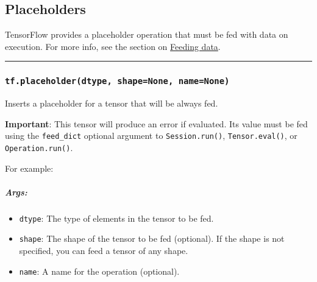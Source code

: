 \subsection{Placeholders }\label{placeholders}

TensorFlow provides a placeholder operation that must be fed with data
on execution. For more info, see the section on
\href{../../how_tos/reading_data/index.md\#feeding}{Feeding data}.

\begin{center}\rule{0.5\linewidth}{\linethickness}\end{center}

\subsubsection{\texorpdfstring{\texttt{tf.placeholder(dtype,\ shape=None,\ name=None)}
}{tf.placeholder(dtype, shape=None, name=None) }}\label{tf.placeholderdtype-shapenone-namenone}

Inserts a placeholder for a tensor that will be always fed.

\textbf{Important}: This tensor will produce an error if evaluated. Its
value must be fed using the \texttt{feed\_dict} optional argument to
\texttt{Session.run()}, \texttt{Tensor.eval()}, or
\texttt{Operation.run()}.

For example:

\begin{Shaded}
\begin{Highlighting}[]
\OperatorTok{=} \OperatorTok{=}\NormalTok{(}\NormalTok{, }\NormalTok{))}
\OperatorTok{=} 

  
   

  \OperatorTok{=} \NormalTok{, }\NormalTok{)}
   \OperatorTok{=}
\end{Highlighting}
\end{Shaded}

\subparagraph{Args: }\label{args}

\begin{itemize}
\tightlist
\item
  \texttt{dtype}: The type of elements in the tensor to be fed.
\item
  \texttt{shape}: The shape of the tensor to be fed (optional). If the
  shape is not specified, you can feed a tensor of any shape.
\item
  \texttt{name}: A name for the operation (optional).
\end{itemize}

